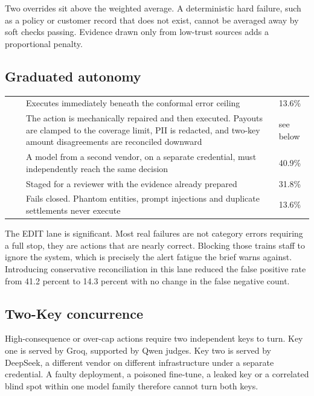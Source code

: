 \documentclass[10pt]{article}
\begin{document}
Two overrides sit above the weighted average. A deterministic hard failure, such as a
policy or customer record that does not exist, cannot be averaged away by soft checks
passing. Evidence drawn only from low-trust sources adds a proportional penalty.

\subsection{Graduated autonomy}

\vspace{2pt}
{\small
\begin{xltabular}{\textwidth}{@{}L{0.13\textwidth}L{0.05\textwidth}YR{0.12\textwidth}@{}}
\toprule
{} &  &  &  \\
\midrule
{} &  & Executes immediately beneath the conformal error ceiling & 13.6\% \\
 &  & The action is mechanically repaired and then executed. Payouts are clamped to the coverage limit, PII is redacted, and two-key amount disagreements are reconciled downward & see below \\
 &  & A model from a second vendor, on a separate credential, must independently reach the same decision & 40.9\% \\
 &  & Staged for a reviewer with the evidence already prepared & 31.8\% \\
 &  & Fails closed. Phantom entities, prompt injections and duplicate settlements never execute & 13.6\% \\
\bottomrule
\end{xltabular}}

The EDIT lane is significant. Most real failures are not category errors requiring a full
stop, they are actions that are nearly correct. Blocking those trains staff to ignore the
system, which is precisely the alert fatigue the brief warns against. Introducing
conservative reconciliation in this lane reduced the false positive rate from 41.2 percent
to 14.3 percent with no change in the false negative count.

\subsection{Two-Key concurrence}

High-consequence or over-cap actions require two independent keys to turn. Key one is
 served by Groq, supported by Qwen judges. Key two is
 served by DeepSeek, a different vendor on different
infrastructure under a separate credential. A faulty deployment, a poisoned fine-tune, a
leaked key or a correlated blind spot within one model family therefore cannot turn both
keys.
\end{document}
